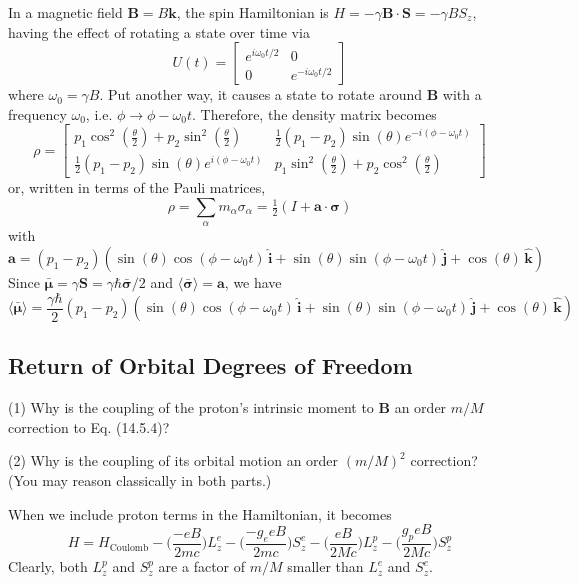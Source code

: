 \documentclass[../principles-of-quantum-mechanics.tex]{subfiles}
\begin{document}
\begin{questions}
\begin{solution}
			In a magnetic field $\mathbf{B} = B\mathbf{k}$, the spin Hamiltonian is $H = -\gamma\mathbf{B}\cdot\mathbf{S} = -\gamma BS_z$, having the effect of rotating a state over time via
			$$U(t) = \begin{bmatrix}e^{i\omega_0t/2} & 0 \\ 0 & e^{-i\omega_0t/2}\end{bmatrix}$$
			where $\omega_0 = \gamma B$. Put another way, it causes a state to rotate around $\mathbf{B}$ with a frequency $\omega_0$, i.e. $\phi \to \phi - \omega_0t$. Therefore, the density matrix becomes
			$$\rho = \begin{bmatrix}
				p_1\cos^2(\tfrac{\theta}{2}) + p_2\sin^2(\tfrac{\theta}{2}) & \tfrac{1}{2}(p_1 - p_2)\sin(\theta)e^{-i(\phi - \omega_0t)} \\
				\tfrac{1}{2}(p_1-p_2)\sin(\theta)e^{i(\phi - \omega_0t)} & p_1\sin^2(\tfrac{\theta}{2}) + p_2\cos^2(\tfrac{\theta}{2})
			\end{bmatrix}$$
			or, written in terms of the Pauli matrices, 
			$$\rho = \sum_\alpha m_\alpha\sigma_\alpha = \tfrac{1}{2}(I + \mathbf{a}\cdot\boldsymbol{\sigma})$$
			with
			$$\mathbf{a} = (p_1 - p_2)(\sin(\theta)\cos(\phi - \omega_0t)\,\hat{\mathbf{i}} + \sin(\theta)\sin(\phi - \omega_0t)\,\hat{\mathbf{j}} + \cos(\theta)\,\hat{\mathbf{k}})$$
			Since $\bar{\boldsymbol{\mu}} = \gamma\mathbf{S} = \gamma\hbar\bar{\boldsymbol{\sigma}}/2$ and $\langle \bar{\boldsymbol{\sigma}}\rangle = \mathbf{a}$, we have
			$$\langle\bar{\boldsymbol{\mu}}\rangle = \frac{\gamma\hbar}{2}(p_1 - p_2)(\sin(\theta)\cos(\phi - \omega_0t)\,\hat{\mathbf{i}} + \sin(\theta)\sin(\phi - \omega_0t)\,\hat{\mathbf{j}} + \cos(\theta)\,\hat{\mathbf{k}})$$
		\end{solution}
	
	\setcounter{subsection}{4}
	\setcounter{question}{0}
	\subsection{Return of Orbital Degrees of Freedom}
	\question (1) Why is the coupling of the proton's intrinsic moment to $\mathbf{B}$ an order $m/M$ correction to Eq. (14.5.4)?
	
	(2) Why is the coupling of its orbital motion an order $(m/M)^2$ correction? (You may reason classically in both parts.)
	\begin{solution}
		When we include proton terms in the Hamiltonian, it becomes
		$$H = H_{\text{Coulomb}} - \Big(\frac{-eB}{2mc}\Big)L_z^e - \Big(\frac{-g_eeB}{2mc}\Big)S_z^e - \Big(\frac{eB}{2Mc}\Big)L_z^p - \Big(\frac{g_peB}{2Mc}\Big)S_z^p$$
		Clearly, both $L_z^p$ and $S_z^p$ are a factor of $m/M$ smaller than $L_z^e$ and $S_z^e$.
		

\end{solution}
\end{questions}
\end{document}
